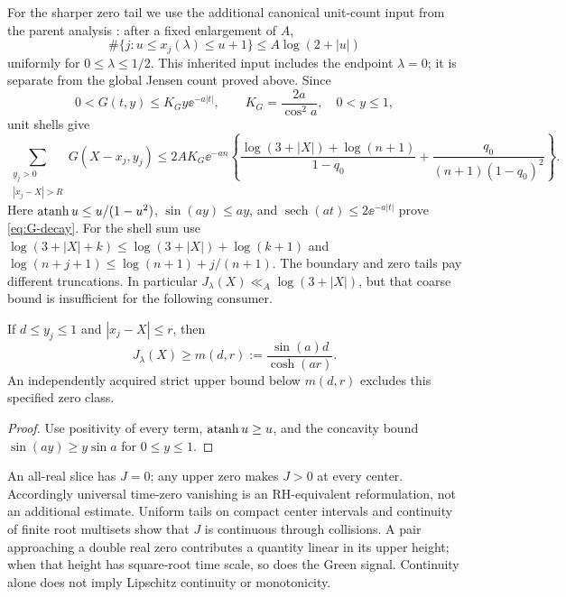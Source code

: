 For the sharper zero tail we use the additional canonical unit-count
input from the parent analysis \cite{SmoothLocalizationProof}:
after a fixed enlargement of \(A\),
\[
 \#\{j:u\le x_j(\lambda)\le u+1\}\le A\log(2+|u|)
\]
uniformly for \(0\le\lambda\le1/2\).
This inherited input includes the endpoint \(\lambda=0\); it is
separate from the global Jensen count proved above. Since
\begin{equation}\label{eq:G-decay}
 0<G(t,y)\le K_Gy\ee^{-a|t|},\qquad
 K_G=\frac{2a}{\cos^2a},\quad 0<y\le1,
\end{equation}
unit shells give
\begin{equation}\label{eq:zero-tail}
 \sum_{\substack{y_j>0\\|x_j-X|>R}}G(X-x_j,y_j)
 \le2AK_G\ee^{-an}
 \left\{\frac{\log(3+|X|)+\log(n+1)}{1-q_0}
       +\frac{q_0}{(n+1)(1-q_0)^2}\right\}.
\end{equation}
Here \(\operatorname{atanh} u\le u/(1-u^2)\), \(\sin(ay)\le ay\), and
\(\operatorname{sech}(at)\le2\ee^{-a|t|}\) prove
\eqref{eq:G-decay}. For the shell sum use
\(\log(3+|X|+k)\le\log(3+|X|)+\log(k+1)\) and
\(\log(n+j+1)\le\log(n+1)+j/(n+1)\).
The boundary and zero tails pay different truncations. In particular
\(J_\lambda(X)\ll_A\log(3+|X|)\), but that coarse bound is insufficient
for the following consumer.

\begin{corollary}\label{cor:margin}
If \(d\le y_j\le1\) and \(|x_j-X|\le r\), then
\begin{equation}\label{eq:margin}
 J_\lambda(X)\ge m(d,r):=\frac{\sin(a)d}{\cosh(ar)}.
\end{equation}
An independently acquired strict upper bound below \(m(d,r)\)
excludes this specified zero class.
\end{corollary}
\begin{proof}
Use positivity of every term, \(\operatorname{atanh} u\ge u\), and the concavity
bound \(\sin(ay)\ge y\sin a\) for \(0\le y\le1\).
\end{proof}

An all-real slice has \(J=0\); any upper zero makes \(J>0\) at every
center. Accordingly universal time-zero vanishing is an RH-equivalent
reformulation, not an additional estimate. Uniform tails on compact
center intervals and continuity of finite root multisets show that
\(J\) is continuous through collisions. A pair approaching a double
real zero contributes a quantity linear in its upper height; when
that height has square-root time scale, so does the Green signal.
Continuity alone does not imply Lipschitz continuity or monotonicity.

